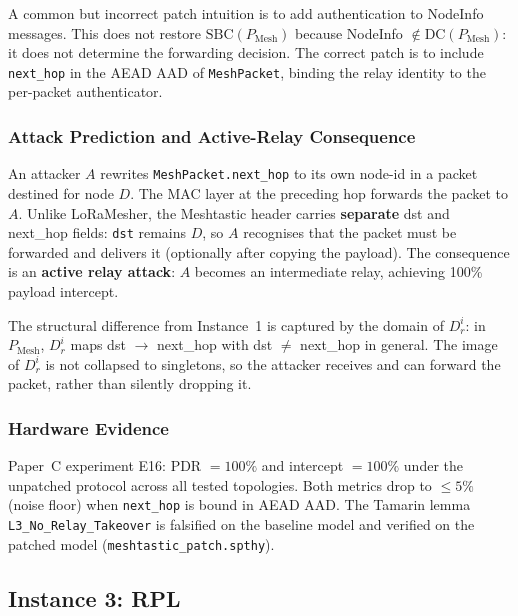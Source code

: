 \begin{remark}
A common but incorrect patch intuition is to add authentication to NodeInfo
messages.
This does not restore $\mathrm{SBC}(P_{\mathrm{Mesh}})$ because NodeInfo
$\notin \mathrm{DC}(P_{\mathrm{Mesh}})$: it does not determine the forwarding
decision.
The correct patch is to include \texttt{next\_hop} in the AEAD AAD of
\texttt{MeshPacket}, binding the relay identity to the per-packet authenticator.
\end{remark}

\subsubsection*{Attack Prediction and Active-Relay Consequence}

An attacker $A$ rewrites \texttt{MeshPacket.next\_hop} to its own node-id in a
packet destined for node $D$.
The MAC layer at the preceding hop forwards the packet to $A$.
Unlike LoRaMesher, the Meshtastic header carries \textbf{separate} dst and
next\_hop fields: \texttt{dst} remains $D$, so $A$ recognises that the packet
must be forwarded and delivers it (optionally after copying the payload).
The consequence is an \textbf{active relay attack}: $A$ becomes an
intermediate relay, achieving 100\% payload intercept.

The structural difference from Instance~1 is captured by the domain of $D_{r}^{i}$:
in $P_{\mathrm{Mesh}}$, $D_{r}^{i}$ maps dst $\to$ next\_hop with
dst $\neq$ next\_hop in general.
The image of $D_{r}^{i}$ is not collapsed to singletons, so the attacker
receives and can forward the packet, rather than silently dropping it.

\subsubsection*{Hardware Evidence}

Paper~C experiment E16: PDR $= 100\%$ and intercept $= 100\%$ under the
unpatched protocol across all tested topologies.
Both metrics drop to $\leq 5\%$ (noise floor) when \texttt{next\_hop} is
bound in AEAD AAD.
The Tamarin lemma \texttt{L3\_No\_Relay\_Takeover} is falsified on the
baseline model and verified on the patched model
(\texttt{meshtastic\_patch.spthy}).

\subsection{Instance 3: RPL}
\label{sec:instances-rpl}

